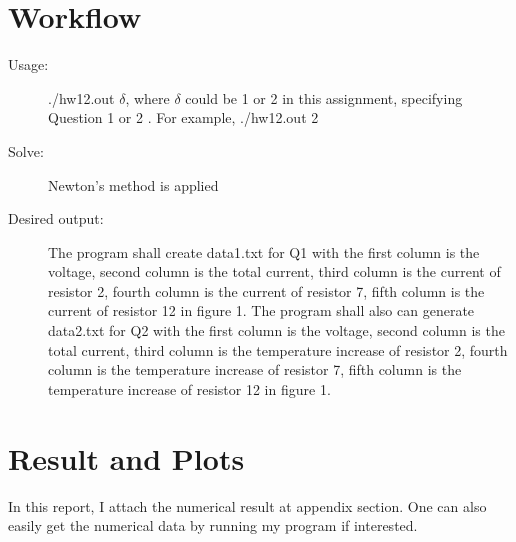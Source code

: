 \documentclass[12pt,a4paper]{article}
\begin{document}
\section{Workflow}
\begin{description}  

\item [Usage:] ./hw12.out  $\delta$, where $\delta$ could be 1 or 2 in this assignment, specifying Question 1 or 2 . For example,  ./hw12.out  2 
\item [Solve:] Newton's method is applied
\item[Desired output:] The program shall create data1.txt for Q1 with the first column is the voltage, second column is the total current, third column is the current of resistor 2, fourth column is the current of resistor 7, fifth column is the current of resistor 12 in figure 1. The program shall also can generate data2.txt for Q2 with the first column is the voltage, second column is the total current, third column is the temperature increase of resistor 2, fourth column is the temperature increase of resistor 7, fifth column is the temperature increase of resistor 12 in figure 1.
\end{description}

\section{Result and Plots}

In this report, I attach the numerical result at appendix section. One can also easily get the numerical data by running my program if interested.
\end{document}
